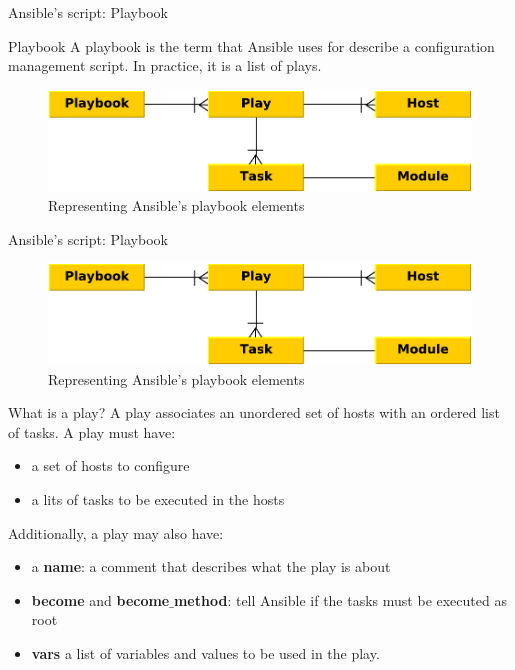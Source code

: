 \documentclass[xcolor=dvipsnames,slidestop, mathserif]{beamer}
\begin{document}
\begin{frame}{Ansible's script: Playbook}
  \begin{block}{Playbook}
  A playbook is the term that Ansible uses for describe a configuration management script. In practice, it is a list of plays.
  \end{block}

  \begin{figure}
     \centering
     \includegraphics[width=.8\columnwidth]{playbook}
     \caption{Representing Ansible's playbook elements}
  \end{figure}
\end{frame}

\begin{frame}[fragile]{Ansible's script: Playbook}
\vspace{-0.5cm}
  \begin{figure}
     \centering
     \includegraphics[width=.4\columnwidth]{playbook}
     \caption{Representing Ansible's playbook elements}
  \end{figure}
\vspace{-0.5cm}
  \begin{block}{What is a play?}
     A play associates an unordered set of hosts with an ordered list of tasks. A play must have:
     \begin{itemize}
        \item a set of hosts to configure
        \item a lits of tasks to be executed in the hosts
     \end{itemize}
    Additionally, a play may also have:
    \begin{itemize}
        \item a \textbf{name}: a comment that describes what the play is about
        \item \textbf{become} and \textbf{become$\_$method}: tell Ansible if the tasks must be executed as root 
        \item \textbf{vars} a list of variables and values to be used in the play.
     \end{itemize}
  \end{block}
\end{frame}
\end{document}

